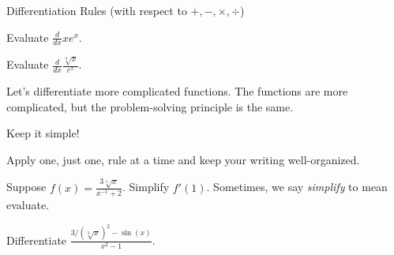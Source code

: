 \documentclass[../main.tex]{subfiles}
\begin{document}
\begin{lesson}{Differentiation Rules (with respect to \(+,-,\times,\div\))}
  \begin{example}
    Evaluate \(\frac{d}{dx} x e^{x}\).

  \end{example}

  \begin{example}
    Evaluate \(\frac{d}{dx} \frac{\sqrt[3]{x}}{e^{x}}\).

  \end{example}
  \clearpage

  Let's differentiate more complicated functions. The functions are more complicated, but the problem-solving principle is the same. 
  \begin{mdframed}[style=simple]
    \color{main}
    \centering
    Keep it simple! 

    Apply one, just one, rule at a time and keep your writing well-organized.
  \end{mdframed}

  \begin{example}
    Suppose \(f(x) = \frac{3 \sqrt[5]{x}}{x^{-1} + 2}\). Simplify \(f'(1)\). 
    \newline
    {\scriptsize Sometimes, we say \emph{simplify} to mean evaluate.}

  \end{example}


  \begin{example}
    Differentiate \(\frac{3/(\sqrt[3]{x})^{2} - \sin(x)}{x^{2} - 1}\).

  \end{example}
  \clearpage
\end{lesson}
\end{document}
